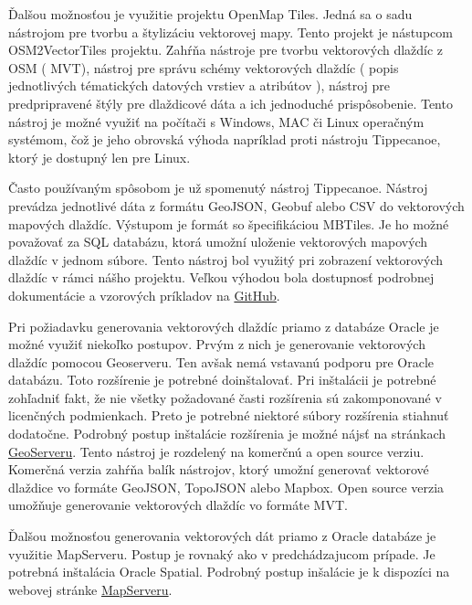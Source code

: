 \documentclass[12pt]{article}
\begin{document}
Ďalšou možnosťou je využitie projektu OpenMap Tiles. Jedná sa o sadu nástrojom pre tvorbu a štylizáciu vektorovej mapy. Tento projekt je nástupcom OSM2VectorTiles projektu. Zahŕňa nástroje pre tvorbu vektorových dlaždíc z OSM ( MVT), nástroj pre správu schémy vektorových dlaždíc ( popis jednotlivých tématických datových vrstiev a atribútov ), nástroj pre predpripravené štýly pre dlaždicové dáta a ich jednoduché prispôsobenie. Tento nástroj je možné využiť na počítači s Windows, MAC či Linux operačným systémom, čož je jeho obrovská výhoda napríklad proti nástroju Tippecanoe, ktorý je dostupný len pre Linux.  

Často používaným spôsobom je už spomenutý nástroj Tippecanoe. Nástroj prevádza jednotlivé dáta z formátu GeoJSON, Geobuf alebo CSV do vektorových mapových dlaždíc. Výstupom je formát so špecifikáciou MBTiles. Je ho možné považovať za SQL databázu, ktorá umožní uloženie vektorových mapových dlaždíc v jednom súbore. Tento nástroj bol využitý pri zobrazení vektorových dlaždíc v rámci nášho projektu. Veľkou výhodou bola dostupnosť podrobnej dokumentácie a vzorových príkladov na  \href{https://github.com/mapbox/tippecanoe}{ GitHub}.

 Pri požiadavku generovania vektorových dlaždíc priamo z databáze Oracle je možné využiť niekoľko postupov. Prvým z nich je generovanie vektorových dlaždíc pomocou Geoserveru. Ten avšak nemá vstavanú podporu pre Oracle databázu. Toto rozšírenie je potrebné doinštalovať. Pri inštalácii je potrebné zohľadniť fakt, že nie všetky požadované časti rozšírenia sú zakomponované v licenčných podmienkach. Preto je potrebné niektoré súbory rozšírenia stiahnuť dodatočne. Podrobný postup inštalácie rozšírenia je možné nájsť na stránkach \href{https://docs.geoserver.org/latest/en/user/data/database/oracle.html?fbclid=IwAR1LNaub9qU3N7TF0pFdn9-31HN7dunrrw8Nlrc7ZUJF_U0We0TaVyEOulA}{ GeoServeru}. Tento nástroj je rozdelený na komerčnú a open source verziu. Komerčná verzia zahŕňa balík nástrojov, ktorý umožní generovať vektorové dlaždice vo formáte GeoJSON, TopoJSON alebo Mapbox. Open source verzia umožňuje generovanie vektorových dlaždíc vo formáte MVT.
 
 Ďalšou možnosťou generovania vektorových dát priamo z Oracle databáze je využitie MapServeru. Postup je rovnaký ako v predchádzajucom prípade. Je potrebná inštalácia Oracle Spatial. Podrobný postup inšalácie je k dispozíci na webovej stránke \href{https://www.mapserver.org/input/vector/oracle.html?fbclid=IwAR11WezCmV5yU9ekxvdiRg76Bs2FQbJ5fafE6ri6op2os-0ahd5lv_dL3Ho}{ MapServeru}.
 
\end{document}
